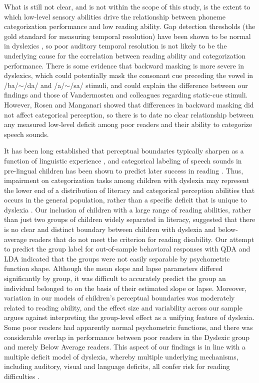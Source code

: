 \documentclass[../uwthesis.tex]{subfiles}
\begin{document}
What is still not clear, and is not within the scope of this study, is the extent to which low-level sensory abilities drive the relationship between phoneme categorization performance and low reading ability. Gap detection thresholds (the gold standard for measuring temporal resolution) have been shown to be normal in dyslexics \cite{Adlard1998,Boets2007,McAnally1997,Schulte-Korne1998}, so poor auditory temporal resolution is not likely to be the underlying cause for the correlation between reading ability and categorization performance. There is some evidence that backward masking is more severe in dyslexics\cite{Wright1997}, which could potentially mask the consonant cue preceding the vowel in /ba/$\sim$/da/ and /a/$\sim$/sa/ stimuli, and could explain the difference between our findings and those of Vandermosten and colleagues regarding static-cue stimuli. However, Rosen and Manganari \cite{Rosen2001} showed that differences in backward masking did not affect categorical perception, so there is to date no clear relationship between any measured low-level deficit among poor readers and their ability to categorize speech sounds. 

It has been long established that perceptual boundaries typically sharpen as a function of linguistic experience \cite{Garnica1973}, and categorical labeling of speech sounds in pre-lingual children has been shown to predict later success in reading \cite{Bradley1983}. Thus, impairment on categorization tasks among children with dyslexia may represent the lower end of a distribution of literacy and categorical perception abilities that occurs in the general population, rather than a specific deficit that is unique to dyslexia \cite{Shaywitz1992}. Our inclusion of children with a large range of reading abilities, rather than just two groups of children widely separated in literacy, suggested that there is no clear and distinct boundary between children with dyslexia and below-average readers that do not meet the criterion for reading disability. Our attempt to predict the group label for out-of-sample behavioral responses with QDA and LDA indicated that the groups were not easily separable by psychometric function shape. Although the mean slope and lapse parameters differed significantly by group, it was difficult to accurately predict the group an individual belonged to on the basis of their estimated slope or lapse. Moreover, variation in our models of children’s perceptual boundaries was moderately related to reading ability, and the effect size and variability across our sample argues against interpreting the group-level effect as a unifying feature of dyslexia. Some poor readers had apparently normal psychometric functions, and there was considerable overlap in performance between poor readers in the Dyslexic group and merely Below Average readers.  This aspect of our findings is in line with a multiple deficit model of dyslexia, whereby multiple underlying mechanisms, including auditory, visual and language deficits, all confer risk for reading difficulties \cite{Joo2017,Joo2017a,Pennington2006,Peterson2015}.
\end{document}
